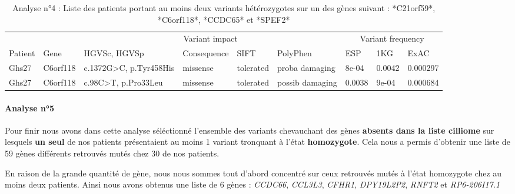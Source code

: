 \documentclass[12pt,twoside]{reedthesis}
\theoremstyle{definition}
\theoremstyle{definition}
\theoremstyle{remark}
\begin{document}
  \begin{landscape}
  \begin{longtable}[t]{lllllllll}
  \caption{\label{tab:tabgrp3low}Analyse n°4 : Liste des patients portant au moins deux variants hétérozygotes sur un des gènes suivant : *C21orf59*, *C6orf118*, *CCDC65*  et  *SPEF2*}\\
  \toprule
  \multicolumn{1}{c}{ } & \multicolumn{1}{c}{ } & \multicolumn{4}{c}{Variant impact} & \multicolumn{3}{c}{Variant frequency} \\
  \cmidrule(l{2pt}r{2pt}){3-6} \cmidrule(l{2pt}r{2pt}){7-9}
  Patient & Gene & HGVSc, HGVSp & Consequence & SIFT & PolyPhen & ESP & 1KG & ExAC\\
  \midrule
  Ghs27 & C6orf118 & c.1372G>C, p.Tyr458His & missense & tolerated & proba damaging & 8e-04 & 0.0042 & 0.000297\\
  Ghs27 & C6orf118 & c.98C>T, p.Pro33Leu & missense & tolerated & possib damaging & 0.0038 & 9e-04 & 0.000684\\
  \bottomrule
  \end{longtable}
  \end{landscape}
  
  \newpage
  
  \paragraph{Analyse n°5}\label{analyse-n5}
  
  Pour finir nous avons dans cette analyse séléctionné l'ensemble des
  variants chevauchant des gènes \textbf{absents dans la liste cilliome}
  sur lesquels \textbf{un seul} de nos patients présentaient au moins 1
  variant tronquant à l'état \textbf{homozygote}. Cela nous a permis
  d'obtenir une liste de 59 gènes différents retrouvés mutés chez 30 de
  nos patients.
  
  En raison de la grande quantité de gène, nous nous sommes tout d'abord
  concentré sur ceux retrouvés mutés à l'état homozygote chez au moins
  deux patients. Ainsi nous avons obtenus une liste de 6 gènes :
  \emph{CCDC66}, \emph{CCL3L3}, \emph{CFHR1}, \emph{DPY19L2P2},
  \emph{RNFT2} et \emph{RP6-206I17.1}
  
\end{document}
